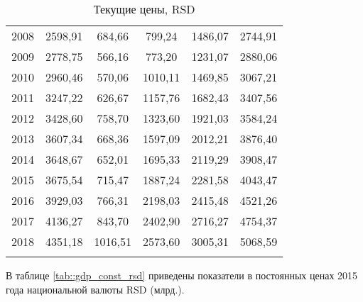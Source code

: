 \begin{longtable}{|c|c|c|c|c|c|}
	2008 & 2598,91 & 684,66  & 799,24  & 1486,07 & 2744,91 \\
	2009 & 2778,75 & 566,16  & 773,20  & 1231,07 & 2880,06 \\
	2010 & 2960,46 & 570,06  & 1010,11 & 1469,85 & 3067,21 \\
	2011 & 3247,22 & 626,67  & 1157,76 & 1682,43 & 3407,56 \\
	2012 & 3428,60 & 758,70  & 1323,60 & 1921,03 & 3584,24 \\
	2013 & 3607,34 & 668,36  & 1597,09 & 2012,21 & 3876,40 \\
	2014 & 3648,67 & 652,01  & 1695,33 & 2119,29 & 3908,47 \\
	2015 & 3675,54 & 715,47  & 1887,24 & 2281,58 & 4043,47 \\
	2016 & 3929,03 & 766,31  & 2198,03 & 2415,48 & 4521,26 \\
	2017 & 4136,27 & 843,70  & 2402,90 & 2716,27 & 4754,37 \\
	2018 & 4351,18 & 1016,51 & 2573,60 & 3005,31 & 5068,59 \\ \hline
	\caption{\label{tab::gdp_cur_rsd} Текущие цены, RSD}
\end{longtable}

В таблице \ref{tab::gdp_const_rsd} приведены показатели в постоянных ценах 2015 года национальной валюты RSD (млрд.).


